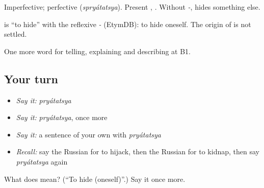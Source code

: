 Imperfective; perfective \emph{} (\emph{spryátatsya}). Present \emph{}, \emph{}. Without \emph{-}, \emph{} hides something else.

\begin{cousinweb}
\emph{} is \emph{} \textquotedblleft{}to hide\textquotedblright{} with the reflexive \emph{-} (EtymDB): to hide oneself. The origin of \emph{} is not settled.
\end{cousinweb}

\begin{grammarlens}[title={What you've built}]
One more word for telling, explaining and describing at B1.
\end{grammarlens}

\subsection*{Your turn}
\begin{itemize}
\raggedright
  \item \emph{Say it:} \emph{pryátatsya}
  \item \emph{Say it:} \emph{pryátatsya}, once more
  \item \emph{Say it:} a sentence of your own with \emph{pryátatsya}
  \item \emph{Recall:} say the Russian for to hijack, then the Russian for to kidnap, then say \emph{pryátatsya} again
\end{itemize}

\begin{tcolorbox}[breakable,colback=teal!4,colframe=teal!35!black,title={Before you move on}]
What does  mean? (\textquotedblleft{}To hide (oneself)\textquotedblright{}.) Say it once more.
\end{tcolorbox}
